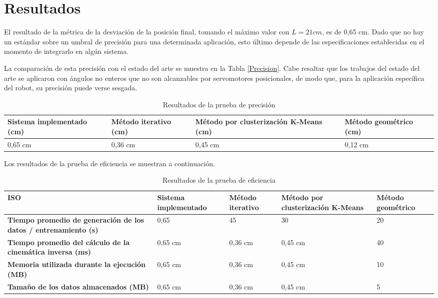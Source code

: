 \section{Resultados}

El resultado de la métrica de la desviación de la posición final, tomando el máximo valor con $L = 21 cm$, es de 0,65 cm. Dado que no hay un estándar sobre un umbral de precisión para una determinada aplicación, esto último depende de las especificaciones establecidas en el momento de integrarlo en algún sistema.

La comparación de esta precisión con el estado del arte se muestra en la Tabla \ref{Precision}. Cabe resaltar que los trabajos del estado del arte se aplicaron con ángulos no enteros que no son alcanzables por servomotores posicionales, de modo que, para la aplicación específica del robot, su precisión puede verse sesgada.

\begin{table}[ht]
	\centering
	\begin{tabular}{p{5cm}p{4cm}p{3.6cm}p{4cm}}
		\hline
		\textbf{Sistema implementado (cm)} & \textbf{Método iterativo (cm)} & \textbf{Método por clusterización K-Means (cm)} & \textbf{Método geométrico (cm)} \\
		\hline
		0,65 cm & 0,36 cm & 0,45 cm & 0,12 cm \\
		\hline
	\end{tabular}
	\caption{Resultados de la prueba de precisión}
	\label{tab:Precision}
\end{table}

Los resultados de la prueba de eficiencia se muestran a continuación.

\begin{table}[ht]
	\centering
	\begin{tabular}{p{3cm}p{3cm}p{3cm}p{3cm}p{3cm}}
		\hline
	    \textbf{ISO} & \textbf{Sistema implementado} & \textbf{Método iterativo} & \textbf{Método por clusterización K-Means} & \textbf{Método geométrico} \\
		\hline
		\textbf{Tiempo promedio de generación de los datos / entrenamiento (s)} & 0,65 & 45 & 30 & 20 \\
		\textbf{Tiempo promedio del cálculo de la cinemática inversa (ms)} & 0,65 cm & 0,36 cm & 0,45 cm & 40 \\
		\textbf{Memoria utilizada durante la ejecución (MB)} & 0,65 cm & 0,36 cm & 0,45 cm & 10 \\
		\textbf{Tamaño de los datos almacenados (MB)} & 0,65 cm & 0,36 cm & 0,45 cm & 5 \\
		\hline
	\end{tabular}
	\caption{Resultados de la prueba de eficiencia}
	\label{tab:Precision}
\end{table}
